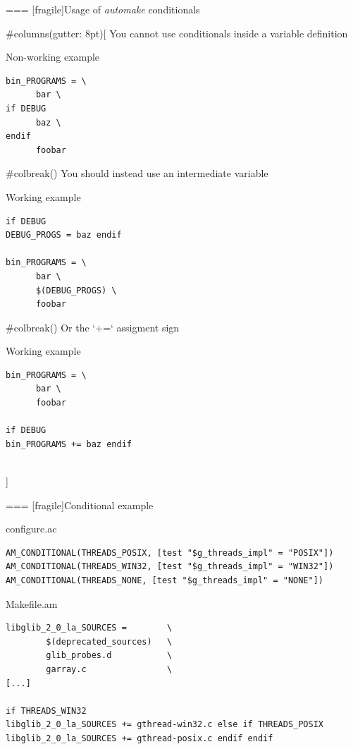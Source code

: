 === [fragile]{Usage of {\em automake} conditionals}

  
#columns(gutter: 8pt)[
    You cannot use conditionals inside a variable definition
    \begin{block}{Non-working example}
\begin{verbatim}
bin_PROGRAMS = \
      bar \
if DEBUG
      baz \
endif
      foobar
\end{verbatim}
\end{block}

     #colbreak()
    You should instead use an intermediate variable

    \begin{block}{Working example}
\begin{verbatim}
if DEBUG
DEBUG_PROGS = baz endif

bin_PROGRAMS = \
      bar \
      $(DEBUG_PROGS) \
      foobar
\end{verbatim}
\end{block}

     #colbreak()
    Or the `+=` assigment sign

    \begin{block}{Working example}
\begin{verbatim}
bin_PROGRAMS = \
      bar \
      foobar

if DEBUG
bin_PROGRAMS += baz endif
\end{verbatim}
\end{block}
\\]


=== [fragile]{Conditional example}

\begin{block}{configure.ac}
\begin{verbatim}
AM_CONDITIONAL(THREADS_POSIX, [test "$g_threads_impl" = "POSIX"])
AM_CONDITIONAL(THREADS_WIN32, [test "$g_threads_impl" = "WIN32"])
AM_CONDITIONAL(THREADS_NONE, [test "$g_threads_impl" = "NONE"])
\end{verbatim}
\end{block}

\begin{block}{Makefile.am}
\begin{verbatim}
libglib_2_0_la_SOURCES =        \
        $(deprecated_sources)   \
        glib_probes.d           \
        garray.c                \
[...]

if THREADS_WIN32
libglib_2_0_la_SOURCES += gthread-win32.c else if THREADS_POSIX
libglib_2_0_la_SOURCES += gthread-posix.c endif endif
\end{verbatim}
\end{block}



